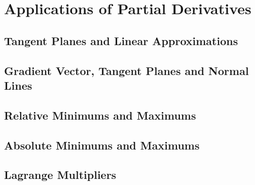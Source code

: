 \documentclass[../satmath.tex]{subfiles}
\begin{document}
\chapter{Applications of Partial Derivatives}
\section{Tangent Planes and Linear Approximations}
\section{Gradient Vector, Tangent Planes and Normal Lines}
\section{Relative Minimums and Maximums}
\section{Absolute Minimums and Maximums}
\section{Lagrange Multipliers}
\end{document}

